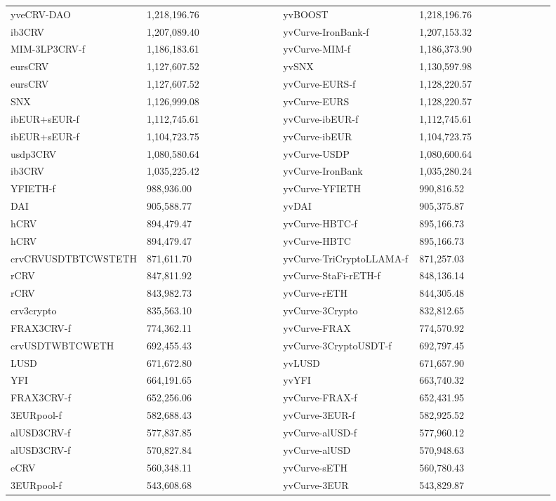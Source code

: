 \begin{longtable}{@{}p{0.25\linewidth}p{0.25\linewidth}p{0.25\linewidth}p{0.25\linewidth}@{}}
yveCRV-DAO & 1,218,196.76 & yvBOOST &1,218,196.76 \\
ib3CRV & 1,207,089.40 & yvCurve-IronBank-f &1,207,153.32 \\
MIM-3LP3CRV-f & 1,186,183.61 & yvCurve-MIM-f &1,186,373.90 \\
eursCRV & 1,127,607.52 & yvSNX &1,130,597.98 \\
eursCRV & 1,127,607.52 & yvCurve-EURS-f &1,128,220.57 \\
SNX & 1,126,999.08 & yvCurve-EURS &1,128,220.57 \\
ibEUR+sEUR-f & 1,112,745.61 & yvCurve-ibEUR-f &1,112,745.61 \\
ibEUR+sEUR-f & 1,104,723.75 & yvCurve-ibEUR &1,104,723.75 \\
usdp3CRV & 1,080,580.64 & yvCurve-USDP &1,080,600.64 \\
ib3CRV & 1,035,225.42 & yvCurve-IronBank &1,035,280.24 \\
YFIETH-f & 988,936.00 & yvCurve-YFIETH &990,816.52 \\
DAI & 905,588.77 & yvDAI &905,375.87 \\
hCRV & 894,479.47 & yvCurve-HBTC-f &895,166.73 \\
hCRV & 894,479.47 & yvCurve-HBTC &895,166.73 \\
crvCRVUSDTBTCWSTETH & 871,611.70 & yvCurve-TriCryptoLLAMA-f &871,257.03 \\
rCRV & 847,811.92 & yvCurve-StaFi-rETH-f &848,136.14 \\
rCRV & 843,982.73 & yvCurve-rETH &844,305.48 \\
crv3crypto & 835,563.10 & yvCurve-3Crypto &832,812.65 \\
FRAX3CRV-f & 774,362.11 & yvCurve-FRAX &774,570.92 \\
crvUSDTWBTCWETH & 692,455.43 & yvCurve-3CryptoUSDT-f &692,797.45 \\
LUSD & 671,672.80 & yvLUSD &671,657.90 \\
YFI & 664,191.65 & yvYFI &663,740.32 \\
FRAX3CRV-f & 652,256.06 & yvCurve-FRAX-f &652,431.95 \\
3EURpool-f & 582,688.43 & yvCurve-3EUR-f &582,925.52 \\
alUSD3CRV-f & 577,837.85 & yvCurve-alUSD-f &577,960.12 \\
alUSD3CRV-f & 570,827.84 & yvCurve-alUSD &570,948.63 \\
eCRV & 560,348.11 & yvCurve-sETH &560,780.43 \\
3EURpool-f & 543,608.68 & yvCurve-3EUR &543,829.87 \\

\end{longtable}
